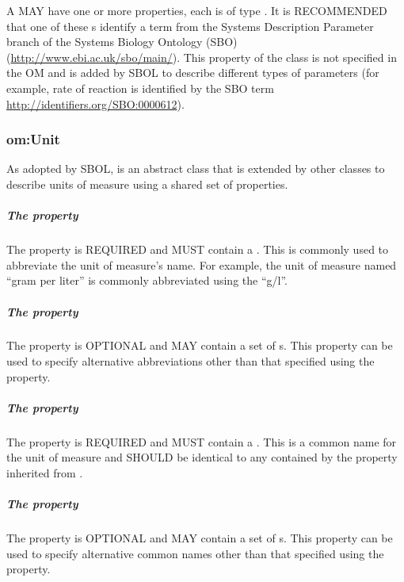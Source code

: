 A  MAY have one or more  properties, each is of type . It is RECOMMENDED that one of these s identify a term from the Systems Description Parameter branch of the Systems Biology Ontology (SBO) (\url{http://www.ebi.ac.uk/sbo/main/}). This  property of the  class is not specified in the OM and is added by SBOL to describe different types of parameters 
(for example, rate of reaction is identified by the SBO term \url{http://identifiers.org/SBO:0000612}).

\subsubsection{om:Unit}
\label{sec:om:Unit}

As adopted by SBOL,  is an abstract class that is extended by other classes to describe units of measure using a shared set of properties. 

\subparagraph{The  property}\label{sec:om:symbol:Unit}
The  property is REQUIRED and MUST contain a . This  is commonly used to abbreviate the unit of measure's name. For example, the unit of measure named ``gram per liter'' is commonly abbreviated using the  ``g/l''.

\subparagraph{The  property}\label{sec:om:alternativeSymbols:Unit}
The  property is OPTIONAL and MAY contain a set of s. This property can be used to specify alternative abbreviations other than that specified using the  property.

\subparagraph{The  property}\label{sec:om:label:Unit}
The  property is REQUIRED and MUST contain a . This  is a common name for the unit of measure and SHOULD be identical to any  contained by the  property inherited from .

\subparagraph{The  property}\label{sec:om:alternativeLabels:Unit}
The  property is OPTIONAL and MAY contain a set of s. This property can be used to specify alternative common names other than that specified using the  property.

